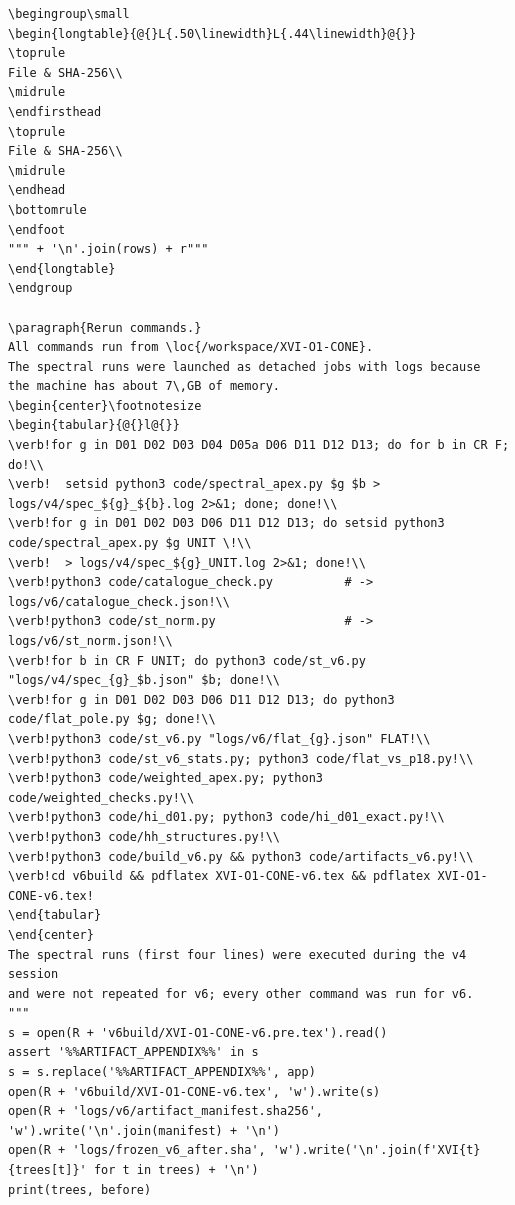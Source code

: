 \documentclass[10pt]{article}
\begin{document}
\begin{lstlisting}
\begingroup\small
\begin{longtable}{@{}L{.50\linewidth}L{.44\linewidth}@{}}
\toprule
File & SHA-256\\
\midrule
\endfirsthead
\toprule
File & SHA-256\\
\midrule
\endhead
\bottomrule
\endfoot
""" + '\n'.join(rows) + r"""
\end{longtable}
\endgroup

\paragraph{Rerun commands.}
All commands run from \loc{/workspace/XVI-O1-CONE}.
The spectral runs were launched as detached jobs with logs because
the machine has about 7\,GB of memory.
\begin{center}\footnotesize
\begin{tabular}{@{}l@{}}
\verb!for g in D01 D02 D03 D04 D05a D06 D11 D12 D13; do for b in CR F; do!\\
\verb!  setsid python3 code/spectral_apex.py $g $b > logs/v4/spec_${g}_${b}.log 2>&1; done; done!\\
\verb!for g in D01 D02 D03 D06 D11 D12 D13; do setsid python3 code/spectral_apex.py $g UNIT \!\\
\verb!  > logs/v4/spec_${g}_UNIT.log 2>&1; done!\\
\verb!python3 code/catalogue_check.py          # -> logs/v6/catalogue_check.json!\\
\verb!python3 code/st_norm.py                  # -> logs/v6/st_norm.json!\\
\verb!for b in CR F UNIT; do python3 code/st_v6.py "logs/v4/spec_{g}_$b.json" $b; done!\\
\verb!for g in D01 D02 D03 D06 D11 D12 D13; do python3 code/flat_pole.py $g; done!\\
\verb!python3 code/st_v6.py "logs/v6/flat_{g}.json" FLAT!\\
\verb!python3 code/st_v6_stats.py; python3 code/flat_vs_p18.py!\\
\verb!python3 code/weighted_apex.py; python3 code/weighted_checks.py!\\
\verb!python3 code/hi_d01.py; python3 code/hi_d01_exact.py!\\
\verb!python3 code/hh_structures.py!\\
\verb!python3 code/build_v6.py && python3 code/artifacts_v6.py!\\
\verb!cd v6build && pdflatex XVI-O1-CONE-v6.tex && pdflatex XVI-O1-CONE-v6.tex!
\end{tabular}
\end{center}
The spectral runs (first four lines) were executed during the v4 session
and were not repeated for v6; every other command was run for v6.
"""
s = open(R + 'v6build/XVI-O1-CONE-v6.pre.tex').read()
assert '%%ARTIFACT_APPENDIX%%' in s
s = s.replace('%%ARTIFACT_APPENDIX%%', app)
open(R + 'v6build/XVI-O1-CONE-v6.tex', 'w').write(s)
open(R + 'logs/v6/artifact_manifest.sha256', 'w').write('\n'.join(manifest) + '\n')
open(R + 'logs/frozen_v6_after.sha', 'w').write('\n'.join(f'XVI{t} {trees[t]}' for t in trees) + '\n')
print(trees, before)
\end{lstlisting}
\end{document}
